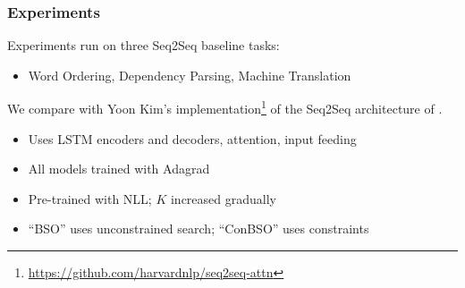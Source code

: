 \documentclass{beamer}
\newcommand{\air}{\vspace{0.25cm}}
\newcommand{\Cite}[1]{{\footnotesize\cite{#1}}}
\newcommand{\boldx}{\boldsymbol{x}}
\let\realcitep\citep
\renewcommand*{\citep}[1]{{\footnotesize \realcitep{#1}}}
\begin{document}
\begin{frame}
  \frametitle{Experiments}
  \air 

  Experiments run on three Seq2Seq baseline tasks:

  \begin{itemize}
  \item Word Ordering, Dependency Parsing, Machine Translation
  \end{itemize}
  
\air
\air

We compare with Yoon Kim's implementation\footnote{\url{https://github.com/harvardnlp/seq2seq-attn}} of the Seq2Seq architecture of \Cite{Luong2015}.
\begin{itemize}
\item Uses LSTM encoders and decoders, attention, input feeding
\item All models trained with Adagrad~\citep{duchi2011adaptive}
\item Pre-trained with NLL; $K$ increased gradually
\item ``BSO'' uses unconstrained search; ``ConBSO'' uses constraints
\end{itemize} 
 
\end{frame}


%
%
\end{document}
